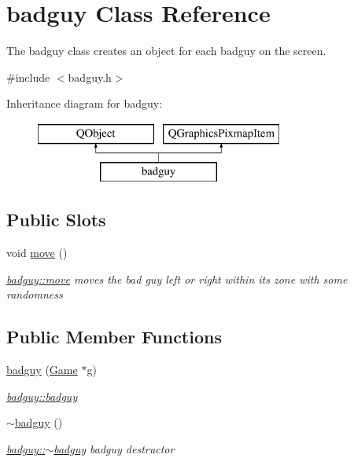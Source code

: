 \hypertarget{classbadguy}{}\section{badguy Class Reference}
\label{classbadguy}


The badguy class creates an object for each badguy on the screen.  




{\ttfamily \#include $<$badguy.\+h$>$}

Inheritance diagram for badguy\+:\begin{figure}[H]
\begin{center}
\leavevmode
\includegraphics[height=2.000000cm]{classbadguy}
\end{center}
\end{figure}
\subsection*{Public Slots}
\begin{DoxyCompactItemize}
\item 
\hypertarget{classbadguy_afc37049fe30b7644247c05a97cc1d4d9}{}void \hyperlink{classbadguy_afc37049fe30b7644247c05a97cc1d4d9}{move} ()\label{classbadguy_afc37049fe30b7644247c05a97cc1d4d9}

\begin{DoxyCompactList}\small\item\em \hyperlink{classbadguy_afc37049fe30b7644247c05a97cc1d4d9}{badguy\+::move} moves the bad guy left or right within its zone with some randomness \end{DoxyCompactList}\end{DoxyCompactItemize}
\subsection*{Public Member Functions}
\begin{DoxyCompactItemize}
\item 
\hyperlink{classbadguy_a4b6d6fdca626a0267236787fbe20b2ad}{badguy} (\hyperlink{class_game}{Game} $\ast$g)
\begin{DoxyCompactList}\small\item\em \hyperlink{classbadguy_a4b6d6fdca626a0267236787fbe20b2ad}{badguy\+::badguy} \end{DoxyCompactList}\item 
\hypertarget{classbadguy_ad5d09cf91dc849e14f9fe31b3220aaa9}{}\hyperlink{classbadguy_ad5d09cf91dc849e14f9fe31b3220aaa9}{$\sim$badguy} ()\label{classbadguy_ad5d09cf91dc849e14f9fe31b3220aaa9}

\begin{DoxyCompactList}\small\item\em \hyperlink{classbadguy_ad5d09cf91dc849e14f9fe31b3220aaa9}{badguy\+::$\sim$badguy} badguy destructor \end{DoxyCompactList}\end{DoxyCompactItemize}


